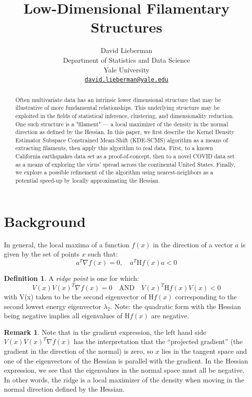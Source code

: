 \documentclass[letterpaper,fleqn]{article}
\title{Low-Dimensional Filamentary Structures}
\author{%
  David Lieberman \\
  Department of Statistics and Data Science \\
  Yale University \\
  \href{mailto:david.lieberman@yale.edu}{\texttt{david.lieberman@yale.edu}} \\
}
\theoremstyle{plain}
\theoremstyle{definition}
\newtheorem{remark}[subsection]{Remark}
\newtheorem{definition}[subsection]{Definition}
\newcommand{\1}{\mathds{1}}
\begin{document}
\maketitle

\begin{abstract}
    Often multivariate data has an intrinsic lower dimensional structure that may be illustrative of more fundamental relationships. This underlying structure may be exploited in the fields of statistical inference, clustering, and dimensionality reduction. One such structure is a "filament" — a local maximizer of the density in the normal direction as defined by the Hessian. In this paper, we first describe the Kernel Density Estimator Subspace Constrained Mean-Shift (KDE-SCMS) algorithm as a means of extracting filaments, then apply this algorithm to real data. First, to a known California earthquakes data set as a proof-of-concept, then to a novel COVID data set as a means of exploring the virus' spread across the continental United States. Finally, we explore a possible refinement of the algorithm using nearest-neighbors as a potential speed-up by locally approximating the Hessian.
\end{abstract}

\section{Background}

In general, the local maxima of a function $f(x)$ in the direction of a vector $a$ is given by the set of points $x$ such that:
$$a^T \nabla f(x) = 0, \quad a^T \mathrm{H}f(x)a < 0$$

\begin{definition}
A \textit{ridge point} is one for which:
$$V(x) V(x)^T \nabla f(x) = 0 \quad \text{AND} \quad V(x)^T \mathrm{H}f(x) V(x) < 0$$
with V(x) taken to be the second eigenvector of H$f(x)$ corresponding to the second lowest energy eigenvector $\lambda_2$. Note: the quadratic form with the Hessian being negative implies all eigenvalues of H$f(x)$ are negative.
\end{definition}

\begin{remark}
Note that in the gradient expression, the left hand side $V(x) V(x)^T \nabla f(x)$ has the interpretation that the “projected gradient” (the gradient in the direction of the normal) is zero, so $x$ lies in the tangent space and one of the eigenvectors of the Hessian is parallel with the gradient. In the Hessian expression, we see that the eigenvalues in the normal space must all be negative. In other words, the ridge is a local maximizer of the density when moving in the normal direction defined by the Hessian.
\end{remark}
\end{document}
